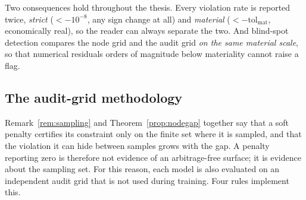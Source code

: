 Two consequences hold throughout the thesis. Every violation rate is reported twice,
\emph{strict} ($<-10^{-8}$, any sign change at all) and \emph{material}
($<-\mathrm{tol}_{\mathrm{mat}}$, economically real), so the reader can always separate the two.
And blind-spot detection compares the node grid and the audit grid \emph{on the same material
scale}, so that numerical residuals orders of magnitude below materiality cannot raise a flag.

\subsection{The audit-grid methodology}

Remark~\ref{rem:sampling} and Theorem~\ref{prop:nodegap} together say that a soft penalty
certifies its constraint only on the finite set where it is sampled, and that the violation it
can hide between samples grows with the gap. A penalty reporting zero is therefore not evidence
of an arbitrage-free surface; it is evidence about the sampling set. For this reason, each model
is also evaluated on an independent audit grid that is not used during training. Four rules
implement this.

